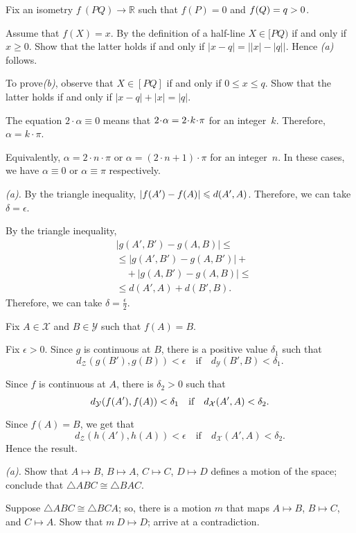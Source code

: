 Fix an isometry $f\:(P Q)\to \mathbb{R}$ such that $f(P)=0$ and $f(Q)=q>0$.

Assume that $f(X)=x$.
By the definition of a half-line $X\in[PQ)$ if and only if $x\ge 0$.
Show that the latter holds if and only if 
$|x-q|=\bigl||x|-|q|\bigr|$.
Hence \textit{(a)} follows.

To prove\textit{(b)}, observe that $X\in [PQ]$ if and only if $0\le x\le q$.
Show that the latter holds if and only if 
$|x-q|+|x|=|q|$.

The equation
$2\cdot\alpha\equiv 0$
means that $2\cdot\alpha\z=2\cdot k\cdot\pi$ for an integer~$k$.
Therefore,
$\alpha=k\cdot\pi$.

Equivalently, $\alpha=2\cdot n\cdot \pi$ or $\alpha=(2\cdot n+1)\cdot \pi$ for an integer~$n$.
In these cases, we have $\alpha\equiv 0$ or $\alpha\equiv \pi$ respectively.

 \textit{(a).}
By the triangle inequality,
$|f(A')-f(A)|\leqslant d(A',A)$.
Therefore, we can take $\delta=\epsilon$.

By the triangle inequality,
\begin{align*}
&|g(A',B')-g(A,B)|
\le 
\\
&\le|g(A',B')-g(A,B')|+
\\
&\quad+
|g(A,B')-g(A,B)|\le
\\
&\le d(A',A)+d(B',B).
\end{align*}
Therefore, we can take $\delta=\tfrac\epsilon2$.

Fix $A\in \mathcal{X}$ and $B\in\mathcal{Y}$
such that $f(A)=B$.

Fix $\epsilon>0$.
Since $g$ is continuous at $B$, there is a positive value $\delta_1$ such that 
$$d_{\mathcal{Z}}(g(B'),g(B))<\epsilon
\quad
\text{if}
\quad
d_{\mathcal{Y}}(B',B)<\delta_1.$$ 

Since $f$ is continuous at $A$, there is $\delta_2>0$ such that 
$$d_{\mathcal{Y}}(f(A'),f(A))<\delta_1
\quad
\text{if}
\quad
d_{\mathcal{X}}(A',A)<\delta_2.$$ 

Since $f(A)=B$, we get that
$$d_{\mathcal{Z}}(h(A'),h(A))<\epsilon
\quad
\text{if}
\quad
d_{\mathcal{X}}(A',A)<\delta_2.$$ 
Hence the result.

 \textit{(a).}
Show that $A\mapsto B$, $B\mapsto A$, $C\mapsto C$, $D\mapsto D$ defines a motion of the space;
conclude that $\triangle ABC\cong \triangle BAC$.

 Suppose $\triangle ABC\cong \triangle BCA$; so, there is a motion $m$ that maps $A\mapsto B$, $B\mapsto C$, and $C\mapsto A$.
Show that $m\:D\mapsto D$; arrive at a contradiction.


